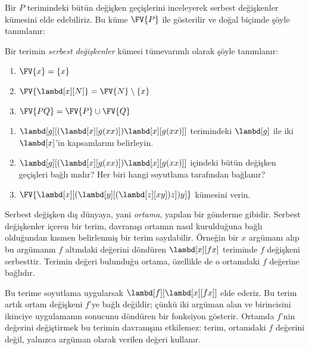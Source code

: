 Bir $P$ terimindeki bütün değişken geçişlerini inceleyerek serbest değişkenler
kümesini elde edebiliriz. Bu küme $\FV{P}$ ile gösterilir ve doğal biçimde
şöyle tanımlanır:

\begin{defn} 
  Bir terimin \emph{serbest değişkenler} kümesi tümevarımlı olarak şöyle
  tanımlanır:
  \begin{enumerate}
    \item $\FV{x} = \{x\}$ 
    \item $\FV{\lambd[x][N]} = \FV{N} \setminus \{x\}$ 
    \item $\FV{PQ} = \FV{P} \cup \FV{Q}$ 
  \end{enumerate}
\end{defn}

\begin{prob}
  \begin{enumerate}
  \item $\lambd[g][(\lambd[x][g (x x)]) \lambd[x][g (x x)]]$ terimindeki
    $\lambd[g]$ ile iki $\lambd[x]$'in kapsamlarını belirleyin.
  \item $\lambd[g][(\lambd[x][g (x x)]) \lambd[x][g (x x)]]$ içindeki
    bütün değişken geçişleri bağlı mıdır? Her biri hangi soyutlama tarafından
    bağlanır?
    \item $\FV{\lambd[x][(\lambd[y][(\lambd[z][x y]) z]) y]}$ kümesini
    verin.
  \end{enumerate}
\end{prob}

\begin{explain}
Serbest değişken dış dünyaya, yani \emph{ortama}, yapılan bir gönderme
gibidir. Serbest değişkenler içeren bir terim, davranışı ortamın nasıl
kurulduğuna bağlı olduğundan kısmen belirlenmiş bir terim sayılabilir.
Örneğin bir $x$ argümanı alıp bu argümanın $f$ altındaki değerini döndüren
$\lambd[x][f x]$ teriminde $f$ değişkeni serbesttir. Terimin değeri bulunduğu
ortama, özellikle de o ortamdaki $f$ değerine bağlıdır.

Bu terime soyutlama uygularsak $\lambd[f][\lambd[x][f x]]$ elde ederiz. Bu
terim artık ortam değişkeni $f$'ye bağlı değildir; çünkü iki argüman alan ve
birincisini ikinciye uygulamanın sonucunu döndüren bir fonksiyon gösterir.
Ortamda $f$'nin değerini değiştirmek bu terimin davranışını etkilemez: terim,
ortamdaki $f$ değerini değil, yalnızca argüman olarak verilen değeri kullanır.
\end{explain}

